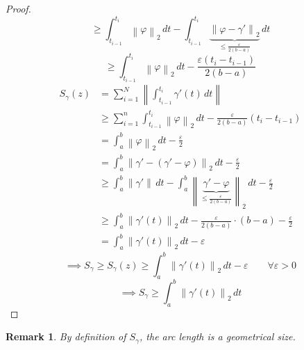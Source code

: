 \documentclass{article}
\newtheorem{remark}{Remark}  \numberwithin{remark}{section}
\newcommand{\norm}[1]{\left\|#1\right\|}
\begin{document}
\begin{proof}
  \[ \geq \int_{t_{i-1}}^{t_i} \norm{\varphi}_2 \, dt - \int_{t_{i-1}}^{t_i} \underbrace{\norm{\varphi - \gamma'}_2}_{\leq \frac{\varepsilon}{2 (b - a)}} \, dt \]
  \[ \geq \int_{t_{i-1}}^{t_i} \norm{\varphi}_2 \, dt - \frac{\varepsilon (t_i - t_{i-1})}{2 (b - a)} \]
  \begin{align*}
    S_\gamma(z) &= \sum_{i=1}^N \norm{\int_{t_{i-1}}^{t_i} \gamma'(t) \, dt} \\
                &\geq \sum_{i=1}^n \int_{t_{i-1}}^{t_i} \norm{\varphi}_2 \, dt - \frac{\varepsilon}{2(b - a)} (t_i - t_{i-1}) \\
                &= \int_a^b \norm{\varphi}_2 \, dt - \frac{\varepsilon}{2} \\
                &= \int_a^b \norm{\gamma' - (\gamma' - \varphi)}_2 \, dt - \frac\varepsilon2 \\
                &\geq \int_a^b \norm{\gamma'} \, dt - \int_a^b \norm{\underbrace{\gamma' - \varphi}_{\leq \frac\varepsilon{2 (b - a)}}}_2 \, dt - \frac\varepsilon2 \\
                &\geq \int_a^b \norm{\gamma'(t)}_2 \, dt - \frac\varepsilon{2(b - a)} \cdot (b - a) - \frac\varepsilon2 \\
                &= \int_a^b \norm{\gamma'(t)}_2 \, dt - \varepsilon
  \end{align*}
  \[ \implies S_\gamma \geq S_\gamma(z) \geq \int_a^b \norm{\gamma'(t)}_2  \, dt - \varepsilon \qquad \forall \varepsilon > 0 \]
  \[ \implies S_\gamma \geq \int_a^b \norm{\gamma'(t)}_2 \, dt \]
\end{proof}

\begin{remark}
  By definition of $S_\gamma$, the arc length is a geometrical size.
\end{remark}
\end{document}
